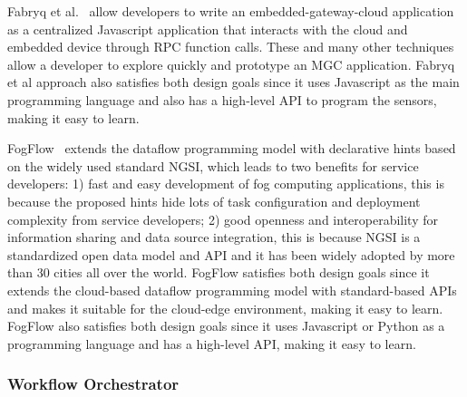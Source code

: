 


Fabryq et al.~\cite{Etemadi2014FabryqUP} allow developers to write an embedded-gateway-cloud application as a centralized Javascript application that interacts with the cloud and embedded device through RPC function calls. These and many other techniques allow a developer to explore quickly and prototype an MGC application. Fabryq et al approach also satisfies both design goals since it uses Javascript as the main programming language and also has a high-level API to program the sensors, making it easy to learn.

FogFlow~\cite{8022859} extends the dataflow programming model with declarative hints based on the widely used standard NGSI, which leads to two benefits for service developers: 1) fast and easy development of fog computing applications, this is because the proposed hints hide lots of task configuration and deployment complexity from service developers; 2) good openness and interoperability for information sharing and data source integration, this is because NGSI is a standardized open data model and API and it has been widely adopted by more than 30 cities all over the world. FogFlow satisfies both design goals since it extends the cloud-based dataflow programming model with standard-based APIs and makes it suitable for the cloud-edge environment, making it easy to learn. FogFlow also satisfies both design goals since it uses Javascript or Python as a programming language and has a high-level API, making it easy to learn.

\subsubsection{Workflow Orchestrator}


